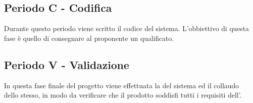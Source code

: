 \documentclass[./PianoDiProgetto.tex]{subfiles}
\begin{document}
  \subsection{Periodo C - Codifica}

  Durante questo periodo viene scritto il codice del sistema. L'obbiettivo
  di questa fase è quello di consegnare al proponente un  qualificato.

  \subsection{Periodo V - Validazione}

  In questa fase finale del progetto viene effettuata la  del sistema ed il
  collaudo dello stesso, in modo da verificare che il prodotto soddisfi tutti i requisiti
  dell'\ARdoc. 
\end{document}
